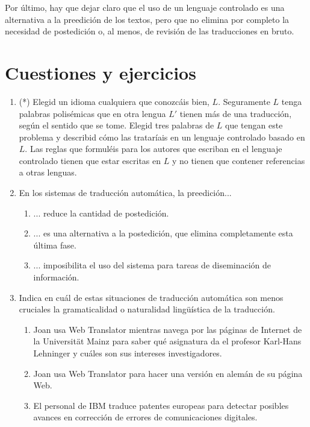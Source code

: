 Por último, hay que dejar claro que el uso de un lenguaje controlado es una alternativa a la preedición de los textos, pero que no elimina por completo la necesidad de postedición o, al menos, de revisión de las traducciones en bruto. 

\section{Cuestiones y ejercicios} \begin{enumerate} \item(*) Elegid un idioma cualquiera que conozcáis bien, $L$. Seguramente $L$ tenga palabras polisémicas que en otra lengua $L'$ tienen más de una traducción, según el sentido que se tome. Elegid tres palabras de $L$ que tengan este problema y describid cómo las trataríais en un lenguaje controlado basado en $L$. Las reglas que formuléis para los autores que escriban en el lenguaje controlado tienen que estar escritas en $L$ y no tienen que contener referencias a otras lenguas. 

\item En los sistemas de traducción automática, la preedición... \begin{enumerate} \item ... reduce la cantidad de postedición. \item ... es una alternativa a la postedición, que elimina completamente esta última fase. \item ... imposibilita el uso del sistema para tareas de diseminación de información. \end{enumerate} 

\item Indica en cuál de estas situaciones de traducción automática son menos cruciales la gramaticalidad o naturalidad lingüística de la traducción. \begin{enumerate} \item Joan usa Web Translator mientras navega por las páginas de Internet de la Universität Mainz para saber qué asignatura da el profesor Karl-Hans Lehninger y cuáles son sus intereses investigadores. \item Joan usa Web Translator para hacer una versión en alemán de su página Web. \item El personal de IBM traduce patentes europeas para detectar posibles avances en corrección de errores de comunicaciones digitales. \end{enumerate} 


\end{enumerate}
